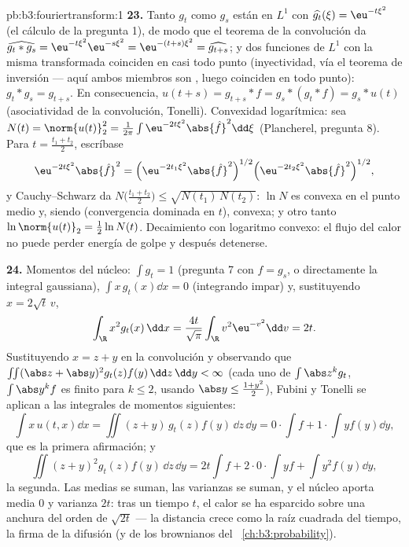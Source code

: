 \begin{solution}{pb:b3:fouriertransform:1}
\textbf{23.} Tanto $g_t$ como $g_s$ están en $L^1$ con
$\widehat{g_t}(\xi) = \eu^{-t\xi^2}$ (el cálculo de la pregunta 1), de
modo que el teorema de la convolución da
$\widehat{g_t * g_s} = \eu^{-t\xi^2}\eu^{-s\xi^2} =
\eu^{-(t+s)\xi^2} = \widehat{g_{t+s}}$; y dos funciones de $L^1$ con la
misma transformada coinciden en casi todo punto (inyectividad, vía el
teorema de inversión --- aquí ambos miembros son
, luego coinciden en todo
punto): $g_t * g_s = g_{t+s}$. En consecuencia,
$u(t + s) = g_{t+s} * f = g_s * (g_t * f) = g_s * u(t)$
(asociatividad de la convolución, Tonelli). Convexidad logarítmica: sea
$N(t) = \norm{u(t)}_2^2 = \frac1{2\pi}\int
\eu^{-2t\xi^2}\abs{\hat f}^2\dd\xi$ (Plancherel, pregunta 8). Para
$t = \frac{t_1 + t_2}2$, escríbase
\[
\eu^{-2t\xi^2}\abs{\hat f}^2
= \Bigl(\eu^{-2t_1\xi^2}\abs{\hat f}^2\Bigr)^{1/2}
\Bigl(\eu^{-2t_2\xi^2}\abs{\hat f}^2\Bigr)^{1/2},
\]
y Cauchy--Schwarz da $N\bigl(\frac{t_1+t_2}2\bigr) \leq
\sqrt{N(t_1)\,N(t_2)}$: $\ln N$ es convexa en el punto medio y, siendo
 (convergencia dominada en
$t$), convexa; y otro tanto $\ln\norm{u(t)}_2 = \frac12\ln N(t)$.
Decaimiento con logaritmo convexo: el flujo del calor no puede perder
energía de golpe y después detenerse.

\textbf{24.} Momentos del núcleo: $\int g_t = 1$ (pregunta 7 con
$f = g_s$, o directamente la integral gaussiana), $\int
x\,g_t(x)\dd x = 0$ (integrando impar) y, sustituyendo $x =
2\sqrt t\,v$,
\[
\int_\R x^2g_t(x)\,\dd x
= \frac{4t}{\sqrt\pi}\int_\R v^2\eu^{-v^2}\dd v = 2t .
\]
Sustituyendo $x = z + y$ en la convolución y observando que
$\iint(\abs z + \abs y)^2g_t(z)f(y)\,\dd z\,\dd y < \infty$
(cada uno de $\int\abs z^kg_t$, $\int\abs y^kf$ es finito para $k
\leq 2$, usando $\abs y \leq \frac{1 + y^2}2$), Fubini y Tonelli se
aplican a las integrales de momentos siguientes:
\[
\int x\,u(t,x)\dd x = \iint (z + y)\,g_t(z)f(y)\,\dd z\,\dd
y = 0\cdot\!\int\! f + 1\cdot\!\int\! yf(y)\dd y,
\]
que es la primera afirmación; y
\[
\iint (z+y)^2g_t(z)f(y)\,\dd z\,\dd y
= 2t\int f + 2\cdot0\cdot\!\int\! yf + \int y^2f(y)\dd y ,
\]
la segunda. Las medias se suman, las varianzas se suman, y el núcleo
aporta media $0$ y varianza $2t$: tras un tiempo $t$, el calor se ha
esparcido sobre una anchura del orden de $\sqrt{2t}$ --- la distancia
crece como la raíz cuadrada del tiempo, la firma de la difusión (y de
los  brownianos del~
\cref{ch:b3:probability}).


\end{solution}
